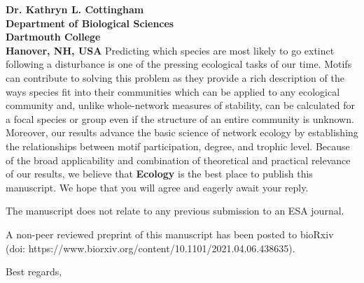 \documentclass[12pt]{letter}
\begin{document}
\begin{letter}{\bf Dr. Kathryn L. Cottingham \\
Department of Biological Sciences \\
Dartmouth College \\
Hanover, NH, USA}
 	Predicting which species are most likely to go extinct following a disturbance is one of the pressing ecological tasks of our time. 
 	Motifs can contribute to solving this problem as they provide a rich description of the ways species fit into their communities which can be applied to any ecological community and, unlike whole-network measures of stability, can be calculated for a focal species or group even if the structure of an entire community is unknown.
 	Moreover, our results advance the basic science of network ecology by establishing the relationships between motif participation, degree, and trophic level. 
 	Because of the broad applicability and combination of theoretical and practical relevance of our results, we believe that \textbf{Ecology} is the best place to publish this manuscript. 
 	We hope that you will agree and eagerly await your reply.


	The manuscript does not relate to any previous submission to an ESA journal. 


	A non-peer reviewed preprint of this manuscript has been posted to bioRxiv \\\noindent(doi: https://www.biorxiv.org/content/10.1101/2021.04.06.438635).

\closing{Best regards,}



\end{letter}
\end{document}
